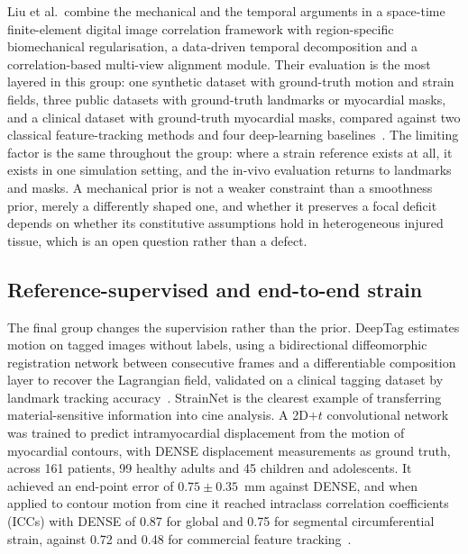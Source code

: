 Liu et al.\ combine the mechanical and the temporal arguments in a space-time finite-element
digital image correlation framework with region-specific biomechanical regularisation, a data-driven
temporal decomposition and a correlation-based multi-view alignment module. Their evaluation is the
most layered in this group: one synthetic dataset with ground-truth motion and strain fields, three
public datasets with ground-truth landmarks or myocardial masks, and a clinical dataset with
ground-truth myocardial masks, compared against two classical feature-tracking methods and four
deep-learning baselines~\citep{liu2026fe}. The limiting factor is the same throughout the group:
where a strain reference exists at all, it exists in one simulation setting, and the in-vivo
evaluation returns to landmarks and masks. A mechanical prior is not a weaker constraint than a
smoothness prior, merely a differently shaped one, and whether it preserves a focal deficit depends
on whether its constitutive assumptions hold in heterogeneous injured tissue, which is an open
question rather than a defect.

\subsection{Reference-supervised and end-to-end strain}\label{sec:supervised}

The final group changes the supervision rather than the prior. DeepTag estimates motion on tagged
images without labels, using a bidirectional diffeomorphic registration network between consecutive
frames and a differentiable composition layer to recover the Lagrangian field, validated on a
clinical tagging dataset by landmark tracking accuracy~\citep{ye2021deeptag}. StrainNet is the
clearest example of transferring material-sensitive information into cine analysis. A 2D$+t$
convolutional network was trained to predict intramyocardial displacement from the motion of
myocardial contours, with DENSE displacement measurements as ground truth, across 161 patients, 99
healthy adults and 45 children and adolescents. It achieved an end-point error of
$0.75\pm0.35$~mm against DENSE, and when applied to contour motion from cine it reached intraclass
correlation coefficients (ICCs) with DENSE of 0.87 for global and 0.75 for segmental circumferential
strain, against 0.72 and 0.48 for commercial feature tracking~\citep{wang2023strainnet}.

